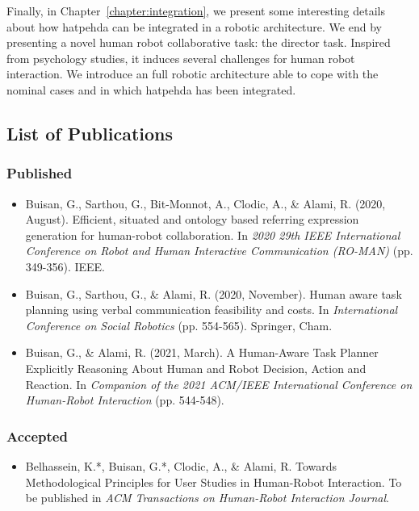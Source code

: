 \documentclass[a4paper,11pt,twoside]{StyleThese}
\begin{document}
Finally, in Chapter~\ref{chapter:integration}, we present some interesting details about how \acrshort{hatpehda} can be integrated in a robotic architecture. We end by presenting a novel human robot collaborative task: the director task. Inspired from psychology studies, it induces several challenges for human robot interaction. We introduce an full robotic architecture able to cope with the nominal cases and in which \acrshort{hatpehda} has been integrated.

\subsection*{List of Publications}
\subsubsection*{Published}
\begin{itemize}
\item Buisan, G., Sarthou, G., Bit-Monnot, A., Clodic, A., \& Alami, R. (2020, August). Efficient, situated and ontology based referring expression generation for human-robot collaboration. In \textit{2020 29th IEEE International Conference on Robot and Human Interactive Communication (RO-MAN)} (pp. 349-356). IEEE.

\item Buisan, G., Sarthou, G., \& Alami, R. (2020, November). Human aware task planning using verbal communication feasibility and costs. In \textit{International Conference on Social Robotics} (pp. 554-565). Springer, Cham.

\item Buisan, G., \& Alami, R. (2021, March). A Human-Aware Task Planner Explicitly Reasoning About Human and Robot Decision, Action and Reaction. In \textit{Companion of the 2021 ACM/IEEE International Conference on Human-Robot Interaction} (pp. 544-548).
\end{itemize}

\subsubsection*{Accepted}
\begin{itemize}
\item Belhassein, K.*, Buisan, G.*, Clodic, A., \& Alami, R. Towards Methodological Principles for User Studies in Human-Robot Interaction. To be published in \textit{ACM Transactions on Human-Robot Interaction Journal}.
\end{itemize}
\end{document}
